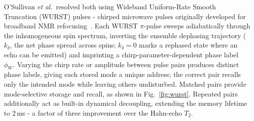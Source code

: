 \documentclass[technote]{IEEEtran}
\begin{document}
O'Sullivan \textit{et al.}\ resolved both using Wideband Uniform-Rate Smooth Truncation (WURST) pulses - chirped microwave pulses originally developed for broadband NMR refocusing~\cite{Kupce1995}. Each WURST $\pi$-pulse sweeps adiabatically through the inhomogeneous spin spectrum, inverting the ensemble dephasing trajectory ($k_\delta$, the net phase spread across spins; $k_\delta=0$ marks a rephased state where an echo can be emitted) and imprinting a chirp-parameter-dependent phase label~$\phi_W$. Varying the chirp rate or amplitude between pulse pairs produces distinct phase labels, giving each stored mode a unique address; the correct pair recalls only the intended mode while leaving others undisturbed. Matched pairs provide mode-selective storage and recall, as shown in Fig.~\ref{fig:wurst}. Repeated pairs additionally act as built-in dynamical decoupling, extending the memory lifetime to 2\,ms - a factor of three improvement over the Hahn-echo $T_2$.
\end{document}
